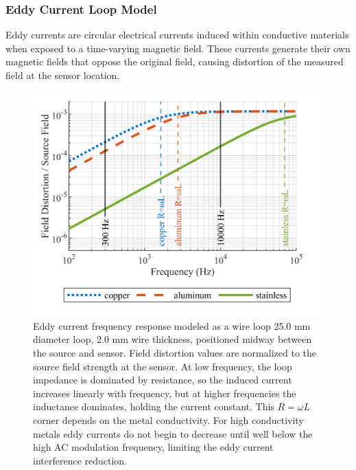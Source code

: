 \documentclass[journal,twoside,web]{ieeecolor}
\begin{document}
\subsubsection{Eddy Current Loop Model}
\label{subsubsec:eddy_current_model}
Eddy currents are circular electrical currents induced within conductive materials when exposed to a time-varying magnetic field. These currents generate their own magnetic fields that oppose the original field, causing distortion of the measured field at the sensor location. 
\begin{figure}[!htbp]
\centerline{\includegraphics[width=\columnwidth]{chaic3.png}}
\caption{Eddy current frequency response modeled as a wire loop 25.0 mm diameter loop, 2.0 mm wire thickness, positioned midway between the source and sensor. Field distortion values are normalized to the source field strength at the sensor. At low frequency, the loop impedance is dominated by resistance, so the induced current increases linearly with frequency, but at higher frequencies the inductance dominates, holding the current constant. This $R = \omega L$ corner depends on the metal conductivity. For high conductivity metals eddy currents do not begin to decrease until well below the high AC modulation frequency, limiting the eddy current interference reduction.}
\label{eddy_current_freq_response}
\end{figure}
\end{document}
